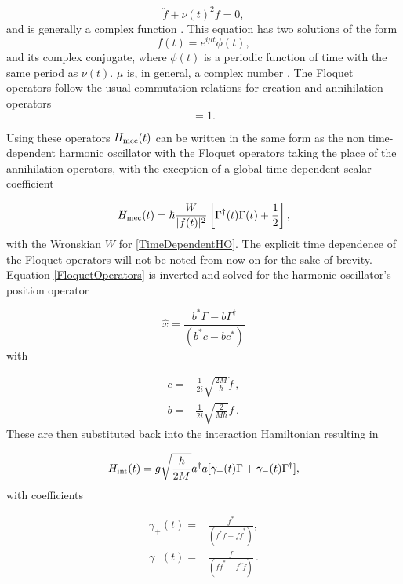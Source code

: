 \documentclass[reprint, amsmath,amssymb, aps,pra]{revtex4-1}
\begin{document}
\begin{equation} \label{TimeDependentHO}
\ddot{f} + \nu(t)^2f=0,
\end{equation} and is generally a complex function \cite{BrownPT}. This equation has two solutions \cite{HanngiFM} of the form
\begin{equation}
f(t) = e^{i\mu t}\phi(t), 
\end{equation}
and its complex conjugate, where $\phi(t)$ is a periodic function of
time with the same period as $\nu(t)$. $\mu$ is, in general, a complex
number \cite{WardFT}. The Floquet operators follow the usual
commutation relations for creation and annihilation operators
\begin{equation}
[\Gamma(t)^\dagger,\Gamma(t)]=1.
\end{equation}

 Using these operators $H_{\rm mec}(t)$ can be written in the same form as the non time-dependent harmonic oscillator with the Floquet operators taking the place of the annihilation operators, with the exception of a global time-dependent scalar coefficient  \cite{BrownPT}

\begin{equation}
H_{\rm mec}(t) = \hbar\frac{W}{|f(t)|^2}\left[\Gamma^\dagger(t)\Gamma(t) + \frac{1}{2}\right],
\end{equation}
with the Wronskian $W$ for \eqref{TimeDependentHO}. The explicit time dependence of the Floquet operators will not be noted from now on for the sake of brevity. Equation
\eqref{FloquetOperators} is inverted and solved for the harmonic
oscillator's position operator \cite{TesisMaestria}

\begin{equation}
\hat{x} = \frac{b^* \Gamma - b\Gamma^\dagger}{(b^*c-bc^*)}
\end{equation} with

\begin{align}
c =&  \frac{1}{2i}\sqrt{\frac{2M}{\hbar}}\dot{f}\, , \\
b =&  \frac{1}{2i}\sqrt{\frac{2}{M\hbar}}f\, .
\end{align}
These are then substituted back into the interaction Hamiltonian
resulting in

\begin{equation}
H_{\rm int}(t) = g\sqrt{\frac{\hbar}{2M}}a^\dagger a[\gamma_+(t)\Gamma +\gamma_-(t)\Gamma^\dagger],
\end{equation} with coefficients

\begin{align*}
\gamma_+(t)=&\frac{f^*}{(f^*\dot{f}-f\dot{f}^*)},\\
\gamma_-(t)=&\frac{f}{(f\dot{f}^*-f^*\dot{f})}\, .
\end{align*} 
\end{document}

